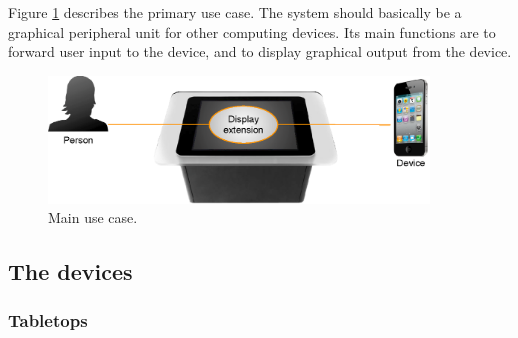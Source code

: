 Figure \ref{fig:useCase} describes the primary use case.
The system should basically be a graphical peripheral unit for other computing devices. Its main functions are to forward user input to the device, and to display graphical output from the device.

\begin{figure}[htb]
  \centering
    \includegraphics[width=0.9\textwidth]{images/useCase}
    \caption{Main use case.}
    \label{fig:useCase}
\end{figure}

\subsection{The devices}

\subsubsection{Tabletops}

